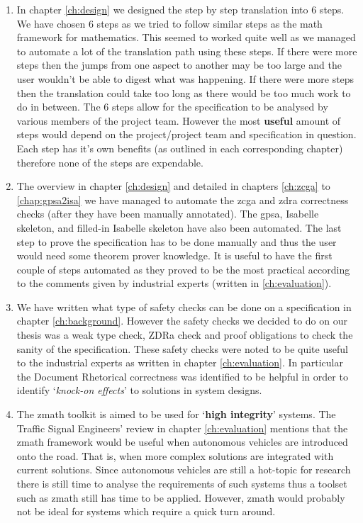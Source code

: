 \begin{enumerate}
    \item In chapter \ref{ch:design} we designed the step by step translation
    into 6 steps. We have chosen 6 steps as we tried to follow similar steps as
    the \gls{math} framework for mathematics. This seemed to worked quite well
    as we managed to automate a lot of the translation path using these steps.
    If there were more steps then the jumps from one aspect to another may be
    too large and the user wouldn't be able to digest what was happening. If
    there were more steps then the translation could take too long as there
    would be too much work to do in between. The 6 steps allow for the
    specification to be analysed by various members of the project team. However
    the most \textbf{useful} amount of steps would depend on the project/project
    team and specification in question. Each step has it's own benefits (as
    outlined in each corresponding chapter) therefore none of the steps are expendable.

    \item The overview in chapter \ref{ch:design} and detailed in chapters
    \ref{ch:zcga} to \ref{chap:gpsa2isa} we have managed to automate the
    \gls{zcga} and \gls{zdra} correctness checks (after they have been manually
    annotated). The \gls{gpsa}, Isabelle skeleton, and filled-in Isabelle
    skeleton have also been automated. The last step to prove the specification
    has to be done manually and thus the user would need some theorem prover
    knowledge. It is useful to have the first couple of steps automated as they
    proved to be the most practical according to the comments given by
    industrial experts (written in \ref{ch:evaluation}).

    \item We have written what type of safety checks can be done on a
    specification in chapter \ref{ch:background}. However the safety checks we
    decided to do on our thesis was a weak type check, ZDRa check and proof
    obligations to check the sanity of the specification. These safety checks
    were noted to be quite useful to the industrial experts as written in
    chapter \ref{ch:evaluation}. In particular the Document Rhetorical
    correctness was identified to be helpful in order to identify
    `\textit{knock-on effects}' to solutions in system designs.

    \item The \gls{zmath} toolkit is aimed to be used for `\textbf{high
    integrity}' systems. The Traffic Signal Engineers' review in chapter
    \ref{ch:evaluation} mentions that the \gls{zmath} framework would be useful
    when autonomous vehicles are introduced onto the road. That is, when more
    complex solutions are integrated with current solutions. Since autonomous
    vehicles are still a hot-topic for research there is still time to analyse
    the requirements of such systems thus a toolset such as \gls{zmath} still
    has time to be applied. However, \gls{zmath} would probably not be ideal for
     systems which require a quick turn around.
\end{enumerate}


